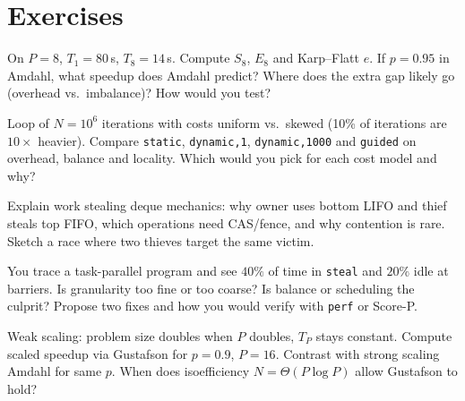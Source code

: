 \section{Exercises}
\begin{exercise}On $P=8$, $T_1=80$\,s, $T_8=14$\,s. Compute $S_8$, $E_8$ and Karp--Flatt $e$. If $p=0.95$ in Amdahl, what speedup does Amdahl predict? Where does the extra gap likely go (overhead vs.\ imbalance)? How would you test?\end{exercise}
\begin{exercise}Loop of $N=10^6$ iterations with costs uniform vs.\ skewed (10\% of iterations are $10\times$ heavier). Compare \texttt{static}, \texttt{dynamic,1}, \texttt{dynamic,1000} and \texttt{guided} on overhead, balance and locality. Which would you pick for each cost model and why?\end{exercise}
\begin{exercise}Explain work stealing deque mechanics: why owner uses bottom LIFO and thief steals top FIFO, which operations need CAS/fence, and why contention is rare. Sketch a race where two thieves target the same victim.\end{exercise}
\begin{exercise}You trace a task-parallel program and see $40\%$ of time in \texttt{steal} and $20\%$ idle at barriers. Is granularity too fine or too coarse? Is balance or scheduling the culprit? Propose two fixes and how you would verify with \texttt{perf} or Score-P.\end{exercise}
\begin{exercise}Weak scaling: problem size doubles when $P$ doubles, $T_P$ stays constant. Compute scaled speedup via Gustafson for $p=0.9$, $P=16$. Contrast with strong scaling Amdahl for same $p$. When does isoefficiency $N=\Theta(P\log P)$ allow Gustafson to hold?\end{exercise}